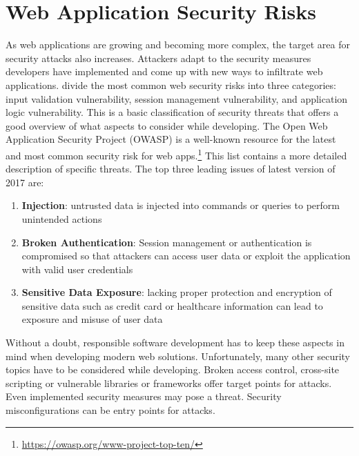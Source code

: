 \section{Web Application Security Risks}
As web applications are growing and becoming more complex, the target area for security attacks also increases. Attackers adapt to the security measures developers have implemented and come up with new ways to infiltrate web applications.\newline
\textcite[5]{Li2014} divide the most common web security risks into three categories: input validation vulnerability, session management vulnerability, and application logic vulnerability. This is a basic classification of security threats that offers a good overview of what aspects to consider while developing. The Open Web Application Security Project (OWASP) is a well-known resource for the latest and most common security risk for web apps.\footnote{ \url{https://owasp.org/www-project-top-ten/}} This list contains a more detailed description of specific threats. The top three leading issues of latest version of 2017 are: 

\begin{enumerate}
    \item \textbf{Injection}: untrusted data is injected into commands or queries to perform unintended actions
    \item \textbf{Broken Authentication}: Session management or authentication is compromised so that attackers can access user data or exploit the application with valid user credentials    
    \item \textbf{Sensitive Data Exposure}: lacking proper protection and encryption of sensitive data such as credit card or healthcare information can lead to exposure and misuse of user data
\end{enumerate}

Without a doubt, responsible software development has to keep these aspects in mind when developing modern web solutions. Unfortunately, many other security topics have to be considered while developing. Broken access control, cross-site scripting or vulnerable libraries or frameworks offer target points for attacks. Even implemented security measures may pose a threat. Security misconfigurations can be entry points for attacks.\newline


